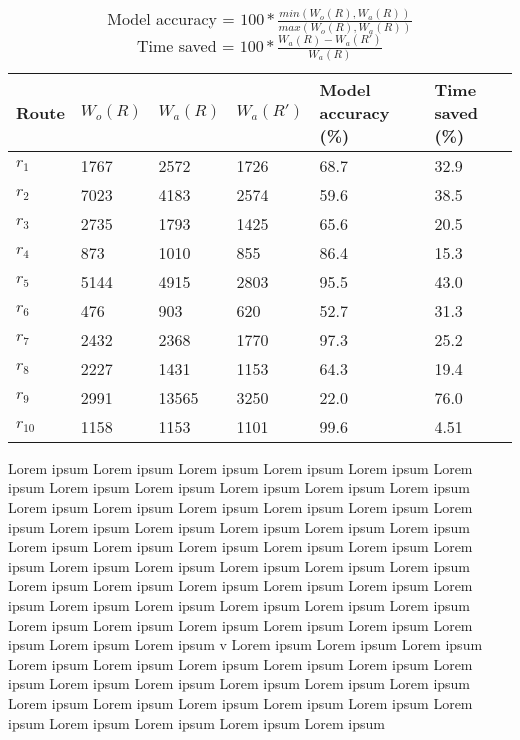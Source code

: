 \begin{table}[]
\centering
\begin{tabular}{llllll}
\textbf{Route} & \textbf{$W_o(R)$} & \textbf{$W_a(R)$}  & \textbf{$W_a(R')$} & \textbf{Model accuracy (\%)} & \textbf{Time saved (\%)} \\ \hline
$r_1$          & 1767              & 2572               & 1726               & 68.7                         & 32.9 \\
$r_2$          & 7023              & 4183               & 2574               & 59.6                         & 38.5 \\
$r_3$          & 2735              & 1793               & 1425               & 65.6                         & 20.5 \\
$r_4$          & 873               & 1010               & 855                & 86.4                         & 15.3 \\
$r_5$          & 5144              & 4915               & 2803               & 95.5                         & 43.0 \\
$r_6$          & 476               & 903                & 620                & 52.7                         & 31.3 \\
$r_7$          & 2432              & 2368               & 1770               & 97.3                         & 25.2 \\
$r_8$          & 2227              & 1431               & 1153               & 64.3                         & 19.4 \\
$r_9$          & 2991              & 13565              & 3250               & 22.0                         & 76.0 \\
$r_{10}$       & 1158              & 1153               & 1101               & 99.6                         & 4.51
\end{tabular}
\caption{Model accuracy = $100 * \frac{min(W_o(R), W_a(R))}{max(W_o(R), W_a(R))}$\\
	     Time saved = $100 * \frac{W_a(R) - W_a(R')}{W_a(R)}$}
\label{tab:eval-results}
\end{table}

Lorem ipsum Lorem ipsum Lorem ipsum Lorem ipsum Lorem ipsum Lorem ipsum Lorem ipsum Lorem ipsum Lorem ipsum Lorem ipsum Lorem ipsum Lorem ipsum Lorem ipsum Lorem ipsum Lorem ipsum Lorem ipsum Lorem ipsum Lorem ipsum Lorem ipsum Lorem ipsum Lorem ipsum Lorem ipsum Lorem ipsum Lorem ipsum Lorem ipsum Lorem ipsum Lorem ipsum Lorem ipsum Lorem ipsum Lorem ipsum Lorem ipsum Lorem ipsum Lorem ipsum Lorem ipsum Lorem ipsum Lorem ipsum Lorem ipsum Lorem ipsum Lorem ipsum Lorem ipsum Lorem ipsum Lorem ipsum Lorem ipsum Lorem ipsum Lorem ipsum Lorem ipsum Lorem ipsum Lorem ipsum Lorem ipsum Lorem ipsum Lorem ipsum Lorem ipsum v
Lorem ipsum Lorem ipsum Lorem ipsum Lorem ipsum Lorem ipsum Lorem ipsum Lorem ipsum Lorem ipsum Lorem ipsum Lorem ipsum Lorem ipsum Lorem ipsum Lorem ipsum Lorem ipsum Lorem ipsum Lorem ipsum Lorem ipsum Lorem ipsum Lorem ipsum Lorem ipsum Lorem ipsum Lorem ipsum Lorem ipsum Lorem ipsum 